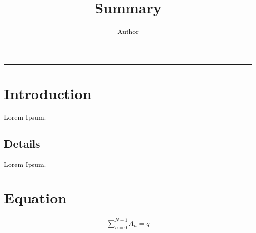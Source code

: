 \documentclass[11pt, oneside]{article}   	%
\title{Summary}
\author{Author}
\date{}							%
\begin{document}
\twocolumn
\maketitle
\tableofcontents
\noindent\rule{0.5\textwidth}{0.5pt}


\section{Introduction}
Lorem Ipsum.
\subsection{Details}
Lorem Ipsum.
\section{Equation}
\begin{align}
	\sum_{n=0}^{N-1} A_n = q
\end{align}
\end{document}
